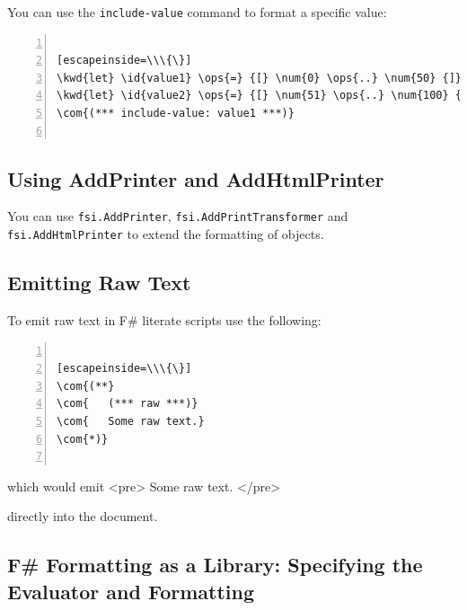 \documentclass{article}
\newcommand{\id}[1]{\textcolor{black}{#1}}
\newcommand{\com}[1]{\textcolor{officegreen}{#1}}
\newcommand{\kwd}[1]{\textcolor{navy}{#1}}
\newcommand{\num}[1]{\textcolor{officegreen}{#1}}
\newcommand{\ops}[1]{\textcolor{purple}{#1}}
\begin{document}
You can use the \texttt{include-value} command to format a specific value:
\begin{lstlisting}[numbers=left]

[escapeinside=\\\{\}]
\kwd{let} \id{value1} \ops{=} {[} \num{0} \ops{..} \num{50} {]}
\kwd{let} \id{value2} \ops{=} {[} \num{51} \ops{..} \num{100} {]}
\com{(*** include-value: value1 ***)}


\end{lstlisting}

\subsection*{Using AddPrinter and AddHtmlPrinter}



You can use \texttt{fsi.AddPrinter}, \texttt{fsi.AddPrintTransformer} and \texttt{fsi.AddHtmlPrinter} to extend the formatting of objects.
\subsection*{Emitting Raw Text}



To emit raw text in F\# literate scripts use the following:
\begin{lstlisting}[numbers=left]

[escapeinside=\\\{\}]
\com{(**}
\com{	(*** raw ***)}
\com{	Some raw text.}
\com{*)}


\end{lstlisting}



which would emit
<pre>
Some raw text.
</pre>


directly into the document.
\subsection*{F\# Formatting as a Library:  Specifying the Evaluator and Formatting}
\end{document}
